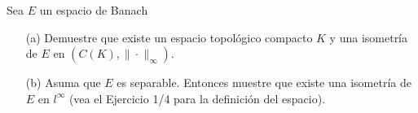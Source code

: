  Sea $E$ un espacio de Banach
 \begin{itemize}
     \item[(a)] Demuestre que existe un espacio topológico compacto $K$ y una isometría de $E$ en $\left(C(K),\|\cdot\|_{\infty}\right)$.
     \item[(b)] Asuma que $E$ es separable. Entonces muestre que existe una isometría de $E$ en $l^{\infty}$ (vea el Ejercicio 1/4 para la definición del espacio).
 \end{itemize}
 